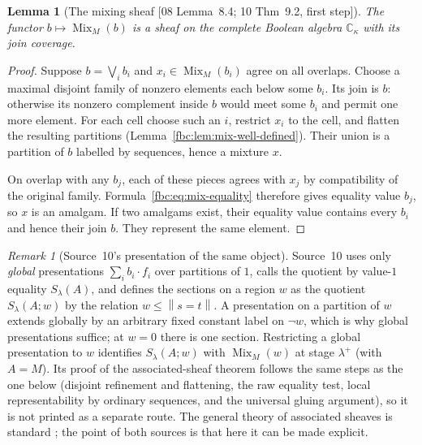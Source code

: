 \documentclass[11pt,letterpaper]{article}
\newtheorem{lemma}[theorem]{Lemma}
\theoremstyle{definition}
\theoremstyle{remark}
\newtheorem{remark}[theorem]{Remark}
\newcommand{\C}{\mathbb C}
\newcommand{\Mix}{\operatorname{Mix}}
\newcommand{\truth}[1]{\left\lVert #1\right\rVert}
\newcommand{\src}[1]{\textup{[#1]}}
\begin{document}
\begin{lemma}[The mixing sheaf \src{08 Lemma~8.4; 10 Thm~9.2, first step}]
\label{fbc:lem:mix-sheaf}
The functor $b\mapsto\Mix_M(b)$ is a sheaf on the complete Boolean
algebra $\C_\kappa$ with its join coverage.
\end{lemma}
\begin{proof}
Suppose $b=\bigvee_i b_i$ and $x_i\in\Mix_M(b_i)$ agree on
all overlaps. Choose a maximal disjoint family of nonzero elements
each below some $b_i$. Its join is $b$: otherwise its nonzero
complement inside $b$ would meet some $b_i$ and permit one more
element. For each cell choose such an $i$, restrict $x_i$ to the
cell, and flatten the resulting partitions
(Lemma~\ref{fbc:lem:mix-well-defined}). Their union is a
partition of $b$ labelled by sequences, hence a mixture $x$.

On overlap with any $b_j$, each of these pieces agrees with $x_j$
by compatibility of the original family.
Formula~\eqref{fbc:eq:mix-equality} therefore gives equality value $b_j$,
so $x$ is an amalgam. If two amalgams exist, their equality value
contains every $b_i$ and hence their join $b$. They represent the same
element.
\end{proof}

\begin{remark}[Source~10's presentation of the same object]
\label{fbc:rem:presentations}
Source~10 uses only \emph{global} presentations $\sum_ib_i\cdot f_i$ over
partitions of $1$, calls the quotient by value-$1$ equality $S_\lambda(A)$,
and defines the sections on a region $w$ as the quotient
$S_\lambda(A;w)$ by the relation $w\leq\truth{s=t}$. A presentation on
a partition of $w$ extends globally by an arbitrary fixed constant label
on $\neg w$, which is why global presentations suffice; at $w=0$ there is
one section. Restricting a global presentation to $w$ identifies
$S_\lambda(A;w)$ with $\Mix_M(w)$ at stage $\lambda^+$ (with $A=M$). Its
proof of the associated-sheaf theorem follows the same steps as the one
below (disjoint refinement and flattening, the raw equality test, local
representability by ordinary sequences, and the universal gluing
argument), so it is not printed as a separate route. The general theory
of associated sheaves is standard \cite{Stacks}; the point of both
sources is that here it can be made explicit.
\end{remark}
\end{document}
